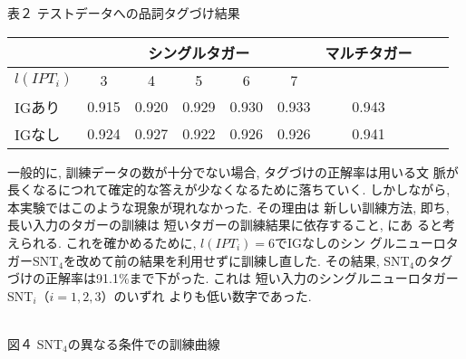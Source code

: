 \begin{center}
表２ テストデータへの品詞タグづけ結果 \bigskip 

\begin{tabular}{lcccccccc} \hline
 & \multicolumn{5}{c}{シングルタガー} &
\multicolumn{1}{c}{マルチタガー}
\\ \hline
$l(IPT_{i})$ \hspace{0.0cm} & 3 \hspace{0.0cm} & 4 \hspace{0.0cm} & 5
\hspace{0.0cm} & 6 \hspace{0.0cm} & 7 \hspace{0.0cm} \\ \hline
IGあり \hspace{0.0cm} & 0.915 \hspace{0.0cm} & 0.920 \hspace{0.0cm}
& 0.929 \hspace{0.0cm} & 0.930 \hspace{0.0cm} & 0.933 \hspace{0.0cm}
& 0.943 \\ \hline
IGなし \hspace{0.0cm} & 0.924 \hspace{0.0cm} & 0.927 \hspace{0.0cm}
&
0.922 \hspace{0.0cm} & 0.926 \hspace{0.0cm} & 0.926 \hspace{0.0cm} &
0.941 \\ \hline
\end{tabular}
\end{center}
\vspace*{4mm}

一般的に, 訓練データの数が十分でない場合, タグづけの正解率は用いる文
脈が長くなるにつれて確定的な答えが少なくなるために落ちていく.
しかしながら, 本実験ではこのような現象が現れなかった. その理由は
新しい訓練方法, 即ち, 長い入力のタガーの訓練は
短いタガーの訓練結果に依存すること, にあ
ると考えられる. これを確かめるために, $l(IPT_{i})=6$でIGなしのシン
グルニューロタガーSNT$_{4}$を改めて前の結果を利用せずに訓練し直した.
その結果, SNT$_{4}$のタグづけの正解率は91.1\%まで下がった. これは
短い入力のシングルニューロタガーSNT$_{i}$（$i=1,2,3$）のいずれ
よりも低い数字であった.

\begin{center}
 \\
図４ SNT$_{4}$の異なる条件での訓練曲線
\end{center}


